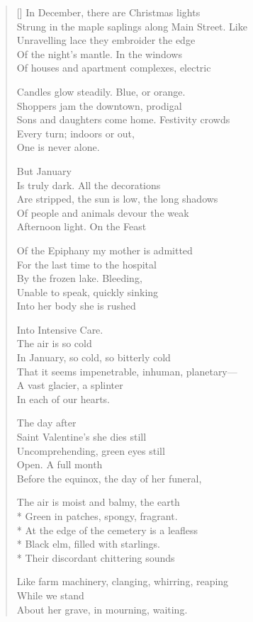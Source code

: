 \label{ch:christmaslight}
\settowidth{\versewidth}{Strung in the maple saplings along Main Street. Like}
\begin{verse}[\versewidth]
In December, there are Christmas lights\\
Strung in the maple saplings along Main Street. Like\\
Unravelling lace they embroider the edge\\
Of the night's mantle. In the windows\\
Of houses and apartment complexes, electric

Candles glow steadily. Blue, or orange.\\
Shoppers jam the downtown, prodigal \\
Sons and daughters come home. Festivity crowds\\
Every turn; indoors or out,\\
One is never alone.

\hspace*{4\vgap} But January \\
Is truly dark. All the decorations\\
Are stripped, the sun is low, the long shadows\\
Of people and animals devour the weak\\
Afternoon light. On the Feast

Of the Epiphany my mother is admitted\\
For the last time to the hospital\\
By the frozen lake. Bleeding,\\
Unable to speak, quickly sinking\\
Into her body she is rushed

Into Intensive Care.\\
\hspace*{4\vgap} The air is so cold\\
In January, so cold, so bitterly cold\\
That it seems impenetrable, inhuman, planetary---\\
A vast glacier, a splinter\\
In each of our hearts.

\hspace*{4\vgap} The day after\\
Saint Valentine's she dies still\\
Uncomprehending, green eyes still\\
Open. A full month\\
Before the equinox, the day of her funeral,

The air is moist and balmy, the earth\\*
Green in patches, spongy, fragrant.\\*
At the edge of the cemetery is a leafless\\*
Black elm, filled with starlings.\\*
Their discordant chittering sounds

Like farm machinery, clanging, whirring, reaping\\
While we stand\\
About her grave, in mourning, waiting.
\end{verse}
